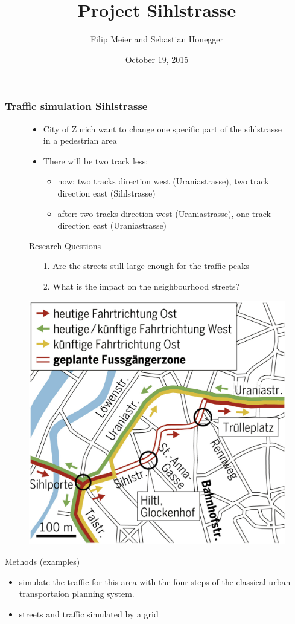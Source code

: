 \documentclass[9pt]{beamer}
\title{Project Sihlstrasse}
\institute[ETH Zurich] {Modelling and Simulating Social Systems\\ETH Zurich}
\author[Filip Meier and Sebastian Honegger]{Filip Meier and Sebastian Honegger}
\date{October 19, 2015}
\begin{document}
\begin{frame}
\frametitle{Traffic simulation Sihlstrasse}

\begin{figure}[H]
\begin{minipage}[t]{.5\textwidth}
\begin{itemize}
\item City of Zurich want to change one specific part of the sihlstrasse in a pedestrian area
\item There will be two track less: 
\begin{itemize}
\item now: two tracks direction west (Uraniastrasse), two track direction east (Sihlstrasse)
\item after: two tracks direction west (Uraniastrasse), one track direction east (Uraniastrasse)
\end{itemize}
\end{itemize}
Research Questions
\begin{itemize}
\item[1.] Are the streets  still large enough for the traffic peaks
\item[2.] What is the impact on the neighbourhood streets?
\end{itemize}

\end{minipage}\hfill
\begin{minipage}[t]{.4\textwidth}
	\centering
	\vspace{0pt}
\includegraphics[width=\textwidth]{Plan_Sihlstrasse.png}
\end{minipage}\hfill
\end{figure}
Methods (examples)
\begin{itemize}
\item simulate the traffic for this area with the four steps of the classical urban transportaion planning system.
\item streets and traffic simulated by a grid 
\end{itemize}
\end{frame}
\end{document}
